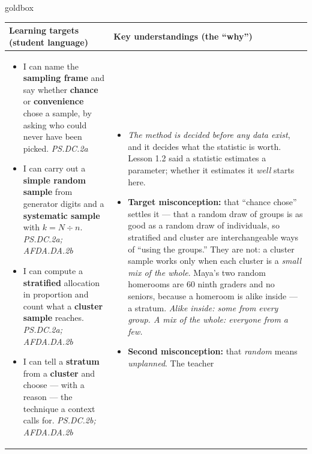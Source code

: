 \documentclass[10pt]{article}
\begin{document}
\renewcommand{\arraystretch}{1.4}
\boxguard
\begin{skillbox}{goldbox}
\begin{tabularx}{\linewidth}{@{}X|X@{}}
\textbf{Learning targets (student language)} & \textbf{Key understandings (the ``why'')} \\[2pt]
\hline
\vspace{-6pt}
\begin{itemize}[leftmargin=1.1em, nosep, after=\vspace{2pt}]
  \item I can name the \textbf{sampling frame} and say whether \textbf{chance} or
        \textbf{convenience} chose a sample, by asking who could never have been picked.
        \hfill \textit{PS.DC.2a}
  \item I can carry out a \textbf{simple random sample} from generator digits and a
        \textbf{systematic sample} with $k = N \div n$. \hfill \textit{PS.DC.2a; AFDA.DA.2b}
  \item I can compute a \textbf{stratified} allocation in proportion and count what a
        \textbf{cluster sample} reaches. \hfill \textit{PS.DC.2a; AFDA.DA.2b}
  \item I can tell a \textbf{stratum} from a \textbf{cluster} and choose --- with a reason ---
        the technique a context calls for. \hfill \textit{PS.DC.2b; AFDA.DA.2b}
\end{itemize}
&
\vspace{-6pt}
\begin{itemize}[leftmargin=1.1em, nosep, after=\vspace{2pt}]
  \item \emph{The method is decided before any data exist}, and it decides what the statistic
        is worth. Lesson 1.2 said a statistic estimates a parameter; whether it estimates it
        \emph{well} starts here.
  \item \textbf{Target misconception:} that ``chance chose'' settles it --- that a random draw
        of groups is as good as a random draw of individuals, so stratified and cluster are
        interchangeable ways of ``using the groups.'' They are not: a cluster sample works only
        when each cluster is a \emph{small mix of the whole}. Maya's two random homerooms are
        $60$ ninth graders and no seniors, because a homeroom is alike inside --- a stratum.
        \emph{Alike inside: some from every group. A mix of the whole: everyone from a few.}
  \item \textbf{Second misconception:} that \emph{random} means \emph{unplanned}. The teacher

\end{itemize}
\end{tabularx}
\end{skillbox}
\end{document}
